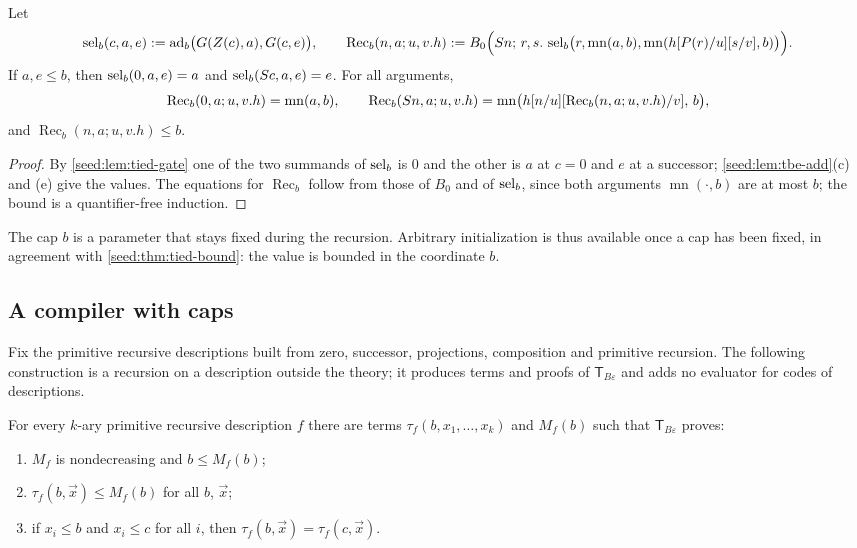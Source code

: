 \begin{lemma}\label{seed:lem:tbe-clip}
Let
\[
 \operatorname{sel}_b(c,a,e)\mathrel{:=}\operatorname{ad}_b\bigl(G(Z(c),a),G(c,e)\bigr),\qquad
 \operatorname{Rec}_b(n,a;u,v.h)\mathrel{:=}
 B_0\Bigl(S n;\,r,s.\,
 \operatorname{sel}_b\bigl(r,\operatorname{mn}(a,b),
 \operatorname{mn}(h[P(r)/u][s/v],b)\bigr)\Bigr).
\]
If $a,e\leq b$, then $\operatorname{sel}_b(0,a,e)=a$ and $\operatorname{sel}_b(S c,a,e)=e$. For all
arguments,
\[
 \operatorname{Rec}_b(0,a;u,v.h)=\operatorname{mn}(a,b),\qquad
 \operatorname{Rec}_b(S n,a;u,v.h)
 =\operatorname{mn}\bigl(h[n/u]
 [\operatorname{Rec}_b(n,a;u,v.h)/v],\,b\bigr),
\]
and $\operatorname{Rec}_b(n,a;u,v.h)\leq b$.
\end{lemma}

\begin{proof}
By \cref{seed:lem:tied-gate} one of the two summands of $\operatorname{sel}_b$ is $0$ and
the other is $a$ at $c=0$ and $e$ at a successor;
\cref{seed:lem:tbe-add}(c) and (e) give the values. The equations for
$\operatorname{Rec}_b$ follow from those of $B_0$ and of $\operatorname{sel}_b$, since both
arguments $\operatorname{mn}(\cdot,b)$ are at most $b$; the bound is a
quantifier-free induction.
\end{proof}

The cap $b$ is a parameter that stays fixed during the recursion. Arbitrary
initialization is thus available once a cap has been fixed, in agreement
with \cref{seed:thm:tied-bound}: the value is bounded in the coordinate $b$.

\subsection{A compiler with caps}

Fix the primitive recursive descriptions built from zero, successor,
projections, composition and primitive recursion. The following construction
is a recursion on a description outside the theory; it produces terms and
proofs of $\mathsf{T}_{B\varepsilon}$ and adds no evaluator for codes of
descriptions.

\begin{theorem}\label{seed:thm:tbe-realize}
For every $k$-ary primitive recursive description $f$ there are terms
$\tau_f(b,x_1,\ldots,x_k)$ and $M_f(b)$ such that
$\mathsf{T}_{B\varepsilon}$ proves:
\begin{enumerate}[label=(\roman*),nosep]
\item $M_f$ is nondecreasing and $b\leq M_f(b)$;
\item $\tau_f(b,\vec x)\leq M_f(b)$ for all $b$, $\vec x$;
\item if $x_i\leq b$ and $x_i\leq c$ for all $i$, then
$\tau_f(b,\vec x)=\tau_f(c,\vec x)$.
\end{enumerate}
\end{theorem}

